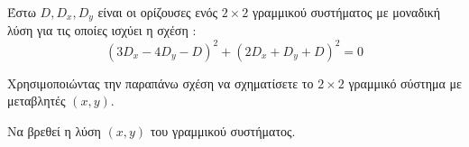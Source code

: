 Έστω $ D,D_x,D_y $ είναι οι ορίζουσες ενός $ 2\times2 $ γραμμικού συστήματος με μοναδική λύση για τις οποίες ισχύει η σχέση :
\[ \left( 3D_x-4D_y-D\right) ^2+\left( 2D_x+D_y+D\right) ^2=0\]
\begin{rlist}
\item Χρησιμοποιώντας την παραπάνω σχέση να σχηματίσετε το $ 2\times2 $ γραμμικό σύστημα με μεταβλητές $ (x,y) $.
\item Να βρεθεί η λύση $ (x,y) $ του γραμμικού συστήματος.
\end{rlist}